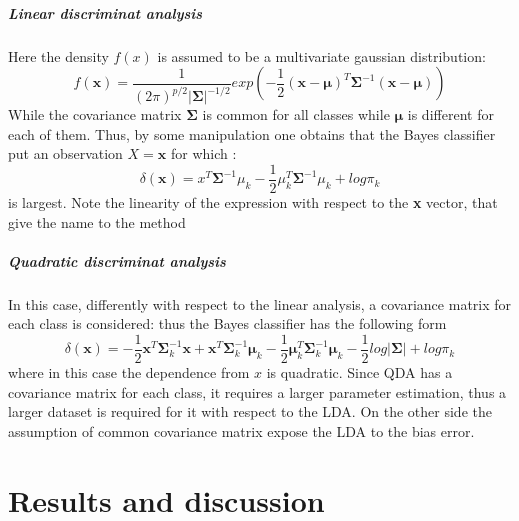 \documentclass[
12pt, %
a4paper, %
oneside, %
headinclude,footinclude, %
BCOR5mm, %
]{scrartcl}
\begin{document}
\subparagraph{Linear discriminat analysis}
Here the density $f(x)$ is assumed to be a multivariate gaussian distribution\cite{james2013introduction}: 
\begin{equation}
f(\textbf{x})=\dfrac{1}{\left(2 \pi\right)^{p/2}\lvert \boldsymbol {\Sigma}\rvert^{-1/2} }exp \left(-\frac{1}{2}\left(\textbf{x}-\boldsymbol{\mu}\right)^{T}\boldsymbol {\Sigma}^{-1}\left(\textbf{x}-\boldsymbol{\mu}\right)\right)
\end{equation}
While the covariance matrix $\boldsymbol {\Sigma}$ is common for all classes while $\boldsymbol{\mu}$ is different for each of them. Thus, by some manipulation one obtains that the Bayes classifier put an observation $X=\textbf{x}$ for which \cite{james2013introduction}:
\begin{equation}
\delta(\textbf{x})=x^{T} \boldsymbol {\Sigma}^{-1} \mu_{k}-\frac{1}{2}\mu^{T}_{k}\boldsymbol {\Sigma}^{-1}\mu_{k}+log\pi_{k}
\end{equation}
is largest. Note the linearity of the expression with respect to the \textbf{x} vector, that give the name to the method 
\subparagraph{Quadratic discriminat analysis}
In this case, differently with respect to the linear analysis, a covariance matrix for each class is considered: thus the Bayes classifier has the following form 
\begin{equation}
\delta(\textbf{x})=-\dfrac{1}{2}\textbf{x}^{T}\boldsymbol {\Sigma}^{-1}_{k}\textbf{x}+\textbf{x}^{T}\boldsymbol {\Sigma}^{-1}_{k}\boldsymbol{\mu}_{k}-\dfrac{1}{2}\boldsymbol{\mu}_{k}^{T}\boldsymbol {\Sigma}^{-1}_{k}\boldsymbol{\mu}_{k}-\dfrac{1}{2}log\lvert \boldsymbol {\Sigma}\rvert+log\pi_{k}
\end{equation}
where in this case the dependence from $x$ is quadratic. Since QDA has a covariance matrix for each class, it requires a larger parameter estimation, thus a larger dataset is required for it with respect to the LDA. On the other side the assumption of common covariance matrix expose the LDA to the bias error.



\section{Results and discussion}
\end{document}
